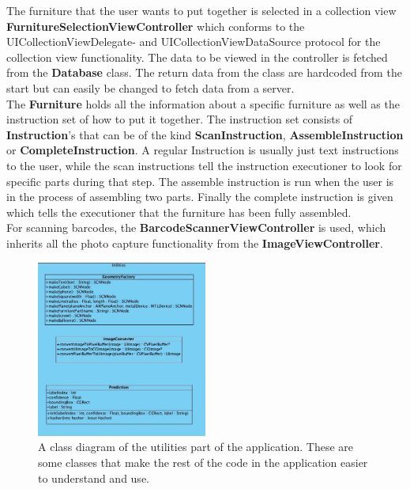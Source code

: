 The furniture that the user wants to put together is selected in a collection view \textbf{FurnitureSelectionViewController}
which conforms to the UICollectionViewDelegate- and UICollectionViewDataSource protocol for the collection view functionality.
The data to be viewed in the controller is fetched from the \textbf{Database} class.
The return data from the class are hardcoded from the start but can easily be changed to fetch
data from a server.\\

The \textbf{Furniture} holds all the information about a specific furniture as well as the instruction set of how to put it together. The instruction set consists of \textbf{Instruction}'s that can be
of the kind \textbf{ScanInstruction}, \textbf{AssembleInstruction} or \textbf{CompleteInstruction}.
A regular Instruction is usually just text instructions to the user, while the scan instructions tell the instruction executioner to look for specific parts during that step.
The assemble instruction is run when the user is in the process of assembling two parts.
Finally the complete instruction is given which tells the executioner that the furniture has been fully assembled.\\

For scanning barcodes, the \textbf{BarcodeScannerViewController} is used, which inherits all the photo capture functionality from the \textbf{ImageViewController}.\\

\begin{figure}[!hbtp]
\begin{center}
\includegraphics[width = 0.5\textwidth]{./Images/UtilitiesClassDiagram.jpg}
\caption{A class diagram of the utilities part of the application. These are some classes that make the rest of the code in the application easier to understand and use.}
\label{fig:classdiagramassembler}
\end{center}
\end{figure}

